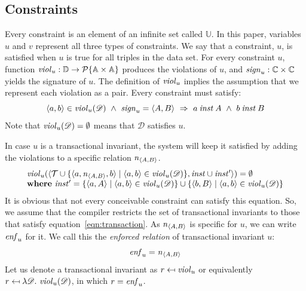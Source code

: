 \documentclass[runningheads]{llncs}
\newcommand{\id}[1]{\text{\it #1\/}}
\newcommand{\instance}{\mathbin{\id{inst}}}
\newcommand{\viol}[2]{\violC{#1}(#2)}
\newcommand{\violC}[1]{\id{viol}_{#1}}
\newcommand{\sign}[1]{\id{sign}_{#1}}
\newcommand{\enfRel}[1]{\id{enf}_{#1}}
\newcommand{\powerset}[1]{\cal{P}\{#1\}}
\newcommand{\declare}[3]{\id{#1}_{\pair{#2}{#3}}}
\newcommand{\pair}[2]{\langle{#1},{#2}\rangle}
\newcommand{\Pair}[2]{#1\times#2}
\newcommand{\triple}[3]{\langle{#1},{#2},{#3}\rangle}
\newcommand{\Atoms}{\mathbb{A}}
\newcommand{\Concepts}{\mathbb{C}}
\newcommand{\triples}{\mathcal{T}}
\newcommand{\Constraints}{\mathbb{U}}
\newcommand{\dataset}{\mathscr{D}}
\newcommand{\Dataset}{\mathbb{D}}
\begin{document}
\subsection{Constraints}
\label{sct:Constraints}
   Every constraint is an element of an infinite set called $\Constraints$.
   In this paper, variables $u$ and $v$ represent all three types of constraints.
   We say that a constraint, $u$, is satisfied when $u$ is true for all triples in the data set.
   For every constraint $u$, function $\violC{u}:\Dataset\rightarrow\powerset{\Pair{\Atoms}{\Atoms}}$ produces the violations of $u$,
   and $\sign{u}:\Pair{\Concepts}{\Concepts}$ yields the signature of $u$.
   The definition of $\violC{u}$ implies the assumption that we represent each violation as a pair.
   Every constraint must satisfy:
\begin{equation}
   \pair{a}{b}\in\viol{u}{\dataset}\ \wedge\ \sign{u}=\pair{A}{B}\ \Rightarrow\ a\instance A\ \wedge\ b\instance B
\label{eqn:wellTypedViolation}
\end{equation}
   Note that $\viol{u}{\dataset}=\emptyset$ means that $\dataset$ satisfies $u$.

   In case $u$ is a transactional invariant,
   the system will keep it satisfied by adding the violations to a specific relation $\declare{n}{A}{B}$.
\begin{equation}
   \begin{array}[t]{l}
      \viol{u}{\pair{\triples\cup\{\triple{a}{\declare{n}{A}{B}}{b}\mid\pair{a}{b}\in\viol{u}{\dataset}\}}{\instance\cup\instance'}}=\emptyset\\
      \text{\bf where}\ \instance'=\{ \pair{a}{A}\mid\pair{a}{b}\in\viol{u}{\dataset}\}\cup\{ \pair{b}{B}\mid\pair{a}{b}\in\viol{u}{\dataset}\}
   \end{array}
\label{eqn:transaction}
\end{equation}
   It is obvious that not every conceivable constraint can satisfy this equation.
   So, we assume that the compiler restricts the set of transactional invariants to those that satisfy equation~\ref{eqn:transaction}.
   As $\declare{n}{A}{B}$ is specific for $u$, we can write $\enfRel{u}$ for it.
   We call this the {\em enforced relation} of transactional invariant $u$:
\begin{equation}
   \enfRel{u}=\declare{n}{A}{B}
\end{equation}
   Let us denote a transactional invariant as $r\mapsfrom\violC{u}$ or equivalently $r \mapsfrom \lambda \dataset.~\viol{u}{\dataset}$,
   in which $r=\enfRel{u}$.
   
\end{document}
